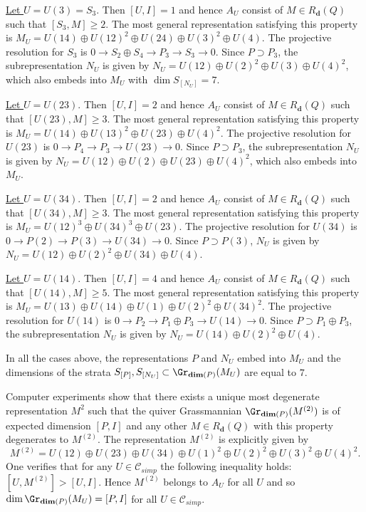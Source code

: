 \documentclass{amsart}
\newcommand{\bd}{\mathbf{d}}
\numberwithin{equation}{section}
\theoremstyle{remark}
\begin{document}
\underline{Let $U=U(3)=S_3$}. Then $[U,I]=1$ and hence $A_U$ consist of $M\in R_\bd(Q)$ such that
$[S_3,M]\ge 2$. The most general representation satisfying this property is 
$M_U=U(14)\oplus U(12)^2\oplus U(24)\oplus U(3)^2\oplus U(4)$.
The projective resolution for $S_3$ is $0\to S_2\oplus S_4\to P_3 \to S_3\to 0$.
Since $P\supset P_3$, the subrepresentation
$N_U$ is given by $N_U=U(12)\oplus U(2)^2\oplus U(3)\oplus U(4)^2$, which also embeds into
$M_U$ with $\dim S_{[N_U]}=7$.

\underline{Let $U=U(23)$}. Then $[U,I]=2$ and hence $A_U$ consist of $M\in R_\bd(Q)$ such that
$[U(23),M]\ge 3$. The most general representation satisfying this property is 
$M_U=U(14)\oplus U(13)^2\oplus U(23)\oplus U(4)^2$.
The projective resolution for $U(23)$ is $0\to P_4\to P_3 \to U(23)\to 0$.
Since $P\supset P_3$, the subrepresentation
$N_U$ is given by $N_U=U(12)\oplus U(2)\oplus U(23)\oplus U(4)^2$, which also embeds into
$M_U$.

\underline{Let $U=U(34)$}. Then $[U,I]=2$ and hence $A_U$ consist of $M\in R_\bd(Q)$ such that
$[U(34),M]\ge 3$. The most general representation satisfying this property is 
$M_U=U(12)^3\oplus U(34)^3\oplus U(23)$.
The projective resolution for $U(34)$ is $0\to P(2)\to P(3) \to U(34)\to 0$.
Since $P\supset P(3)$,  
$N_U$ is given by $N_U=U(12)\oplus U(2)^2\oplus U(34)\oplus U(4)$.

\underline{Let $U=U(14)$}. Then $[U,I]=4$ and hence $A_U$ consist of $M\in R_\bd(Q)$ such that
$[U(14),M]\ge 5$. The most general representation satisfying this property is 
$M_U=U(13)\oplus U(14)\oplus U(1)\oplus U(2)^2\oplus U(34)^2$.
The projective resolution for $U(14)$ is $0\to P_2\to P_1\oplus P_3 \to U(14)\to 0$.
Since $P\supset P_1\oplus P_3$, the subrepresentation 
$N_U$ is given by $N_U=U(14)\oplus U(2)^2\oplus U(4)$.

In all the cases above, the representations $P$ and $N_U$ embed into $M_U$ and 
the dimensions of the strata $S_{[P]}, S_{[N_U]}\subset \Gr_{{\rm\bf dim}(P)}(M_U)$ are equal to $7$.

Computer experiments show that there exists a unique most degenerate representation $M^2$
such that the quiver Grassmannian 
$\Gr_{{\rm \bf dim}(P)}(M^{(2)})$ is of expected dimension $[P,I]$ and any other $M\in R_\bd(Q)$ with this property
degenerates to $M^{(2)}$. The representation $M^{(2)}$ is explicitly given by 
\[
M^{(2)}=U(12)\oplus U(23)\oplus U(34)\oplus U(1)^2\oplus U(2)^2\oplus U(3)^2\oplus U(4)^2.
\]
One verifies that for any $U\in \mathcal{C}_{simp}$ the following inequality holds:
$[U,M^{(2)}]>[U,I]$. Hence $M^{(2)}$ belongs to $A_U$ for all $U$ and so
$\dim \Gr_{{\rm\bf dim}(P)}(M_U)=[P,I]$ for all $U\in \mathcal{C}_{simp}$.
\end{document}
